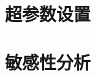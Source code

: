 \documentclass[../main_zh.tex]{subfiles}
\begin{document}
\section{超参数设置}

\section{敏感性分析}
\end{document}

